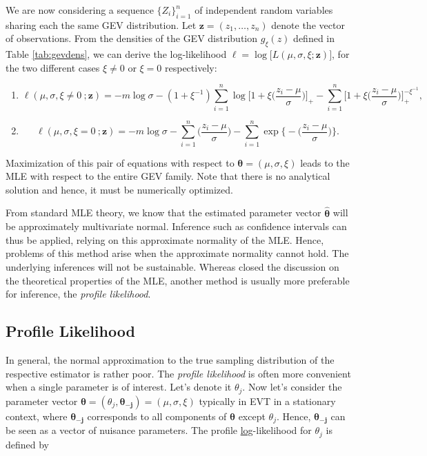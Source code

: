We are now considering a sequence $\{Z_i\}_{i=1}^n$ of independent random variables sharing 
each the same GEV distribution. Let $\boldsymbol{z}=(z_1,\dots,z_n)$ denote the vector of 
observations.
From the densities of the GEV distribution $g_{\xi}(z)$ defined in 
Table \ref{tab:gevdens}, we can derive the log-likelihood 
$\ell=\log\big[L(\mu,\sigma,\xi;\boldsymbol{z})\big]$, for the two different cases $\xi\neq 0$ or $\xi=0$ respectively:
\begin{enumerate}
	\item \begin{equation} \label{llik12}
	\ell(\mu,\sigma,\xi\neq 0\ ;\textbf{z})= 
	-m\log\sigma-(1+\xi^{-1})\sum_{i=1}^n\log\bigg[1+\xi\bigg(\frac{z_i-\mu}{\sigma}\bigg)\bigg]_+-\sum_{i=1}^n\bigg[1+\xi\bigg(\frac{z_i-\mu}{\sigma}\bigg)\bigg]_+^{-\xi^{-1}},
	\end{equation}
	
	\item \begin{equation} \label{llik0}
	\ell(\mu,\sigma,\xi=0\ ;\textbf{z})=-m\log 
	\sigma-\sum_{i=1}^n\bigg(\frac{z_i-\mu}{\sigma}\bigg)-\sum_{i=1}^{n}\exp\bigg\{-\bigg(\frac{z_i-\mu}{\sigma}\bigg)\bigg\}.
	\end{equation}
\end{enumerate}

Maximization of this pair of equations with respect to $\boldsymbol{\theta}=(\mu,\sigma,\xi)$ leads to the MLE with respect to the entire GEV family. Note that there is no analytical solution and hence, it must be numerically optimized.

From standard MLE theory, we know that the estimated parameter vector $\hat{\boldsymbol{\theta}}$ will be approximately multivariate normal. Inference such as confidence intervals can thus be applied, relying on this approximate normality of the MLE. Hence, problems of this method arise when the approximate normality cannot hold. The underlying inferences will not be sustainable. Whereas \citet{zhou_extent_2010} closed the discussion on the theoretical properties of the MLE, another method is usually more preferable for inference, the \emph{profile likelihood}.


\subsection*{Profile Likelihood}

In general, the normal approximation to the true sampling distribution of the respective estimator is rather poor. The \emph{profile likelihood} is often more convenient when a single parameter is of interest. Let's denote it $\theta_j$. Now let's consider the parameter vector $\boldsymbol{\theta}=(\theta_j,\boldsymbol{\theta_{-j}})= (\mu,\sigma,\xi)$ typically in EVT in a stationary context, where $\boldsymbol{\theta_{-j}}$ corresponds to all components of $\boldsymbol{\theta}$ except $\theta_j$. Hence, $\boldsymbol{\theta_{-j}}$ can be seen as a vector of nuisance parameters.
The profile \underline{log}-likelihood for $\theta_j$ is defined by 

